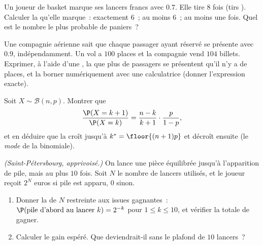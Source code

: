 \begin{exercise}[$\star\star$]\label{exo:g12:randvar:5}
Un joueur de basket marque ses lancers francs avec  $0.7$. Elle
tire $8$ fois (tirs ). Calculer la  qu'elle marque~:
exactement $6$~; au moins $6$~; au moins une fois. Quel est le nombre le
plus probable de paniers~?
\end{exercise}

\begin{exercise}[$\star\star$]\label{exo:g12:randvar:6}
Une compagnie aérienne sait que chaque passager ayant réservé se présente
avec  $0.9$, indépendamment. Un vol a $100$ places et la
compagnie vend $104$ billets. Exprimer, à l'aide d'une , la
 que plus de passagers se présentent qu'il n'y a de places, et
la borner numériquement avec une calculatrice (donner l'expression exacte).
\end{exercise}

\begin{exercise}[$\star\star$]\label{exo:g12:randvar:7}
Soit $X \sim \mathcal B(n, p)$. Montrer que
\[
\frac{\P(X = k+1)}{\P(X = k)} = \frac{n-k}{k+1}\cdot\frac{p}{1-p},
\]
et en déduire que la  croît jusqu'à
$k^* = \floor{(n+1)p}$ et décroît ensuite (le \emph{mode} de la
binomiale).
\end{exercise}

\begin{exercise}[$\star\star\star$]\label{exo:g12:randvar:8}
\emph{(Saint-Pétersbourg, apprivoisé.)} On lance une pièce équilibrée
jusqu'à l'apparition de pile, mais au plus $10$ fois. Soit $N$ le nombre de
lancers utilisés, et le joueur reçoit $2^N$ euros si pile est apparu, $0$
sinon.
\begin{enumerate}
  \item Donner la  de $N$ restreinte aux issues gagnantes~:
        $\P(\text{pile d'abord au lancer } k) = 2^{-k}$ pour
        $1 \leq k \leq 10$, et vérifier la  totale de gagner.
  \item Calculer le gain espéré. Que deviendrait-il sans le plafond de
        $10$ lancers~?
\end{enumerate}
\end{exercise}

